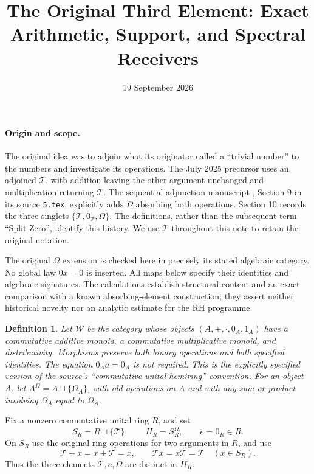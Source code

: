 \documentclass[11pt]{article}
\title{The Original Third Element: Exact Arithmetic, Support, and Spectral Receivers}
\author{}
\date{19 September 2026}
\newtheorem{definition}[theorem]{Definition}
\newcommand{\Z}{\mathbb Z}
\begin{document}
\maketitle

\paragraph{Origin and scope.}
The original idea was to adjoin what its originator called a ``trivial number'' to the numbers and investigate its operations. The July 2025 precursor \cite{original} uses an adjoined $\mathcal T$, with addition leaving the other argument unchanged and multiplication returning $\mathcal T$. The sequential-adjunction manuscript \cite{sequential}, Section 9 in its source \texttt{5.tex}, explicitly adds $\Omega$ absorbing both operations. Section 10 records the three singlets $\{\mathcal T,0_{\Z},\Omega\}$. The definitions, rather than the subsequent term ``Split-Zero'', identify this history. We use $\mathcal T$ throughout this note to retain the original notation.

The original $\Omega$ extension is checked here in precisely its stated algebraic category. No global law $0x=0$ is inserted. All maps below specify their identities and algebraic signatures. The calculations establish structural content and an exact comparison with a known absorbing-element construction; they assert neither historical novelty nor an analytic estimate for the RH programme.

\begin{definition}
Let $\mathcal W$ be the category whose objects $(A,+,\cdot,0_A,1_A)$ have a commutative additive monoid, a commutative multiplicative monoid, and distributivity. Morphisms preserve both binary operations and both specified identities. The equation $0_Aa=0_A$ is not required. This is the explicitly specified version of the source's ``commutative unital hemiring'' convention.
For an object $A$, let $A^\Omega=A\sqcup\{\Omega_A\}$, with old operations on $A$ and with any sum or product involving $\Omega_A$ equal to $\Omega_A$.
\end{definition}

Fix a nonzero commutative unital ring $R$, and set
\[
S_R=R\sqcup\{\mathcal T\},\qquad H_R=S_R^\Omega,
\qquad e=0_R\in R.
\]
On $S_R$ use the original ring operations for two arguments in $R$, and use
\[
\mathcal T+x=x+\mathcal T=x,\qquad
\mathcal T x=x\mathcal T=\mathcal T\quad(x\in S_R).
\]
Thus the three elements $\mathcal T,e,\Omega$ are distinct in $H_R$.
\end{document}
